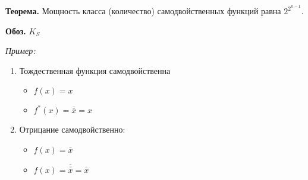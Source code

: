 \documentclass[10pt]{article}
\begin{document}
\par\textbf{Теорема.} Мощность класса (количество) самодвойственных функций равна $2^{2^{n-1}}$.
\par\textbf{Обоз.} $K_S$

\par\textit{Пример:}
\begin{enumerate}
    \item Тождественная функция самодвойственна
        \begin{itemize}
            \item $f(x) = x$
            \item $f^*(x) = \overline {\overline x} = x$
        \end{itemize}
    \item Отрицание самодвойственно:
        \begin{itemize}
            \item $f(x) = \overline x$
            \item $f(x) = \overline {\overline {\overline x}} = \overline x$
        \end{itemize}
\end{enumerate}
\end{document}
